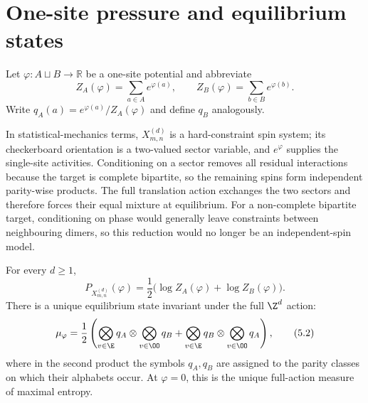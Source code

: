 \section{One-site pressure and equilibrium states}\label{sec:pressure}

Let $\varphi:A\sqcup B\to\mathbb R$ be a one-site potential and abbreviate
\[
 Z_A(\varphi)=\sum_{a\in A}e^{\varphi(a)},
 \qquad
 Z_B(\varphi)=\sum_{b\in B}e^{\varphi(b)}.
\]
Write $q_A(a)=e^{\varphi(a)}/Z_A(\varphi)$ and define $q_B$ analogously.

In statistical-mechanics terms, $X_{m,n}^{(d)}$ is a hard-constraint spin
system; its checkerboard orientation is a two-valued sector variable, and
$e^{\varphi}$ supplies the single-site activities.  Conditioning on a sector
removes all residual interactions because the target is complete bipartite,
so the remaining spins form independent parity-wise products.  The full
translation action exchanges the two sectors and therefore forces their
equal mixture at equilibrium.  For a non-complete bipartite target,
conditioning on phase would generally leave constraints between neighbouring
dimers, so this reduction would no longer be an independent-spin model.

\begin{theorem}\label{thm:pressure}
For every $d\geq1$,
\[
 P_{X_{m,n}^{(d)}}(\varphi)
 =\frac12\bigl(\log Z_A(\varphi)+\log Z_B(\varphi)\bigr).
 \tag{5.1}\label{eq:pressure}
\]
There is a unique equilibrium state invariant under the full $\Z^d$ action:
\[
 \mu_\varphi=\frac12\left(
 \bigotimes_{v\in\E}q_A\otimes\bigotimes_{v\in\OO}q_B
 +
 \bigotimes_{v\in\E}q_B\otimes\bigotimes_{v\in\OO}q_A
 \right),
 \tag{5.2}\label{eq:eqstate}
\]
where in the second product the symbols $q_A,q_B$ are assigned to the
parity classes on which their alphabets occur.  At $\varphi=0$, this is the
unique full-action measure of maximal entropy.
\end{theorem}

